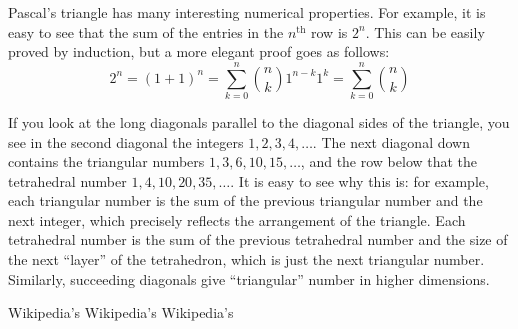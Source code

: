 \documentclass[12pt]{article}
\begin{document}
Pascal's triangle has many interesting numerical properties. For example, it is easy to see that the sum of the entries in the $n^{\mathrm{th}}$ row is $2^n$. This can be easily proved by induction, but a more elegant proof goes as follows:
\[2^n=(1+1)^n=\sum_{k=0}^n \binom{n}{k} 1^{n-k}1^k=\sum_{k=0}^n \binom{n}{k} \]

If you look at the long diagonals parallel to the diagonal sides of the triangle, you see in the second diagonal the integers $1,2,3,4,\ldots$. The next diagonal down contains the triangular numbers $1,3,6,10,15,\ldots$, and the row below that the tetrahedral number $1,4,10,20,35,\ldots$. It is easy to see why this is: for example, each triangular number is the sum of the previous triangular number and the next integer, which precisely reflects the arrangement of the triangle. Each tetrahedral number is the sum of the previous tetrahedral number and the size of the next ``layer'' of the tetrahedron, which is just the next triangular number. Similarly, succeeding diagonals give ``triangular'' number in higher dimensions.

\begin{thebibliography}{9}
  Wikipedia's 
  Wikipedia's 
  Wikipedia's 
\end{thebibliography}
\end{document}
